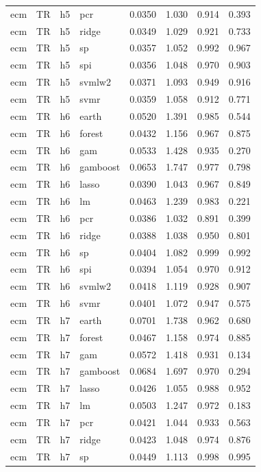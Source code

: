 \begin{ThreePartTable}
\begin{longtable}[t]{llclcccc}
ecm & TR & h5 & pcr & 0.0350 & 1.030 & 0.914 & 0.393\\
ecm & TR & h5 & ridge & 0.0349 & 1.029 & 0.921 & 0.733\\
ecm & TR & h5 & sp & 0.0357 & 1.052 & 0.992 & 0.967\\
ecm & TR & h5 & spi & 0.0356 & 1.048 & 0.970 & 0.903\\
ecm & TR & h5 & svmlw2 & 0.0371 & 1.093 & 0.949 & 0.916\\
ecm & TR & h5 & svmr & 0.0359 & 1.058 & 0.912 & 0.771\\
\addlinespace
ecm & TR & h6 & earth & 0.0520 & 1.391 & 0.985 & 0.544\\
ecm & TR & h6 & forest & 0.0432 & 1.156 & 0.967 & 0.875\\
ecm & TR & h6 & gam & 0.0533 & 1.428 & 0.935 & 0.270\\
ecm & TR & h6 & gamboost & 0.0653 & 1.747 & 0.977 & 0.798\\
ecm & TR & h6 & lasso & 0.0390 & 1.043 & 0.967 & 0.849\\
ecm & TR & h6 & lm & 0.0463 & 1.239 & 0.983 & 0.221\\
ecm & TR & h6 & pcr & 0.0386 & 1.032 & 0.891 & 0.399\\
ecm & TR & h6 & ridge & 0.0388 & 1.038 & 0.950 & 0.801\\
ecm & TR & h6 & sp & 0.0404 & 1.082 & 0.999 & 0.992\\
ecm & TR & h6 & spi & 0.0394 & 1.054 & 0.970 & 0.912\\
ecm & TR & h6 & svmlw2 & 0.0418 & 1.119 & 0.928 & 0.907\\
ecm & TR & h6 & svmr & 0.0401 & 1.072 & 0.947 & 0.575\\
\addlinespace
ecm & TR & h7 & earth & 0.0701 & 1.738 & 0.962 & 0.680\\
ecm & TR & h7 & forest & 0.0467 & 1.158 & 0.974 & 0.885\\
ecm & TR & h7 & gam & 0.0572 & 1.418 & 0.931 & 0.134\\
ecm & TR & h7 & gamboost & 0.0684 & 1.697 & 0.970 & 0.294\\
ecm & TR & h7 & lasso & 0.0426 & 1.055 & 0.988 & 0.952\\
ecm & TR & h7 & lm & 0.0503 & 1.247 & 0.972 & 0.183\\
ecm & TR & h7 & pcr & 0.0421 & 1.044 & 0.933 & 0.563\\
ecm & TR & h7 & ridge & 0.0423 & 1.048 & 0.974 & 0.876\\
ecm & TR & h7 & sp & 0.0449 & 1.113 & 0.998 & 0.995\\

\end{longtable}
\end{ThreePartTable}
